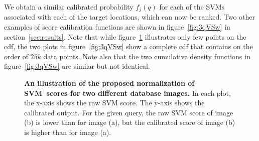       We obtain a similar calibrated probability $f_j(q)$ for each of the SVMs associated with each of the target locations, which can now be ranked.
      Two other examples of score calibration functions are shown in figure~\ref{fig:3qVSw} in section~\ref{sec:results}. 
Note that while figure~\ref{fig:calib} illustrates only few points on the cdf, the two plots in figure~\ref{fig:3qVSw} show a complete cdf that contains on the order of $25k$ data points. Note also that the two cumulative density functions in figure~\ref{fig:3qVSw} are similar but not identical.
      \begin{figure}[t]
         \vspace{1mm}
         \vspace{1.5mm}\newline
         \vspace*{-3mm}
         \caption[]{
            \textbf{An illustration of the proposed normalization of SVM~scores for two different database images.}
            In each plot, the x-axis shows the raw SVM score. The y-axis shows the calibrated output. For the given query, the raw SVM score of image (b) is lower than for image (a), but the calibrated score of image (b) is higher than for image (a). 
         }
         \vspace*{-2mm}
         \label{fig:calib}
      \end{figure}

